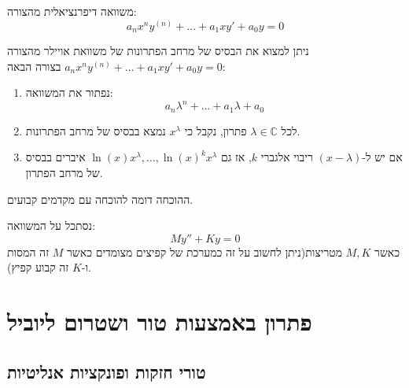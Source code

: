 \documentclass{tstextbook}
\begin{document}
\begin{definition}
משוואה דיפרנציאלית מהצורה:
$$a_n x^n y^{(n)}+...+a_1 x y' + a_0 y = 0$$

\end{definition}
\begin{proposition}
ניתן למצוא את הבסיס של מרחב הפתרונות של משוואת אויילר מהצורה \(a_n x^n y^{(n)}+...+a_1 x y' + a_0 y = 0\) בצורה הבאה:

  \begin{enumerate}
    \item נפתור את המשוואה: 
$$a_n \lambda^n + ... + a_1\lambda + a_0$$


    \item לכל \(\lambda \in \mathbb{C}\) פתרון, נקבל כי \(x^{\lambda}\) נמצא בבסיס של מרחב הפתרונות. 


    \item אם יש ל-\(\left( x-\lambda \right)\) ריבוי אלגברי \(k\), אז גם \(\ln(x)x^{\lambda},\dots,\ln(x)^{k}x^{\lambda}\) איברים בבסיס של מרחב הפתרון. 


  \end{enumerate}
\end{proposition}
ההוכחה דומה להוכחה עם מקדמים קבועים.

\begin{example}
נסתכל על המשוואה:
$$My''+Ky=0$$
כאשר \(M,K\) מטריצות(ניתן לחשוב על זה כמערכת של קפיצים מצומדים כאשר \(M\) זה המסות ו-\(K\) זה קבוע קפיץ).

\end{example}
\section{פתרון באמצעות טור ושטרום ליוביל}

\subsection{טורי חזקות ופונקציות אנליטיות}
\end{document}
